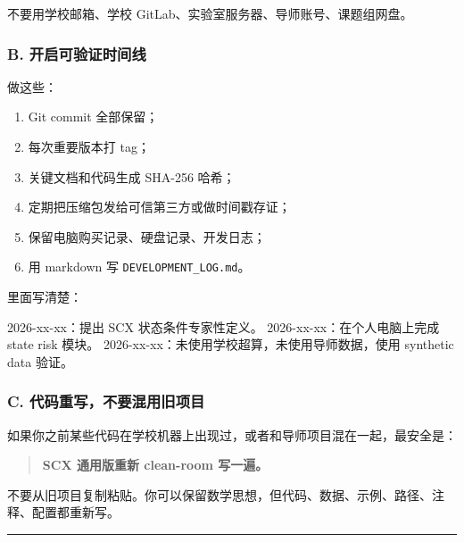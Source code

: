 \documentclass[
  12pt,
]{ctexart}
\newenvironment{Shaded}{}{}
\newcommand{\NormalTok}[1]{#1}
\providecommand{\tightlist}{%
  \setlength{\itemsep}{0pt}\setlength{\parskip}{0pt}}
\begin{document}
不要用学校邮箱、学校 GitLab、实验室服务器、导师账号、课题组网盘。

\subsubsection{B.
开启可验证时间线}\label{b.-ux5f00ux542fux53efux9a8cux8bc1ux65f6ux95f4ux7ebf}

做这些：

\begin{enumerate}
\def\labelenumi{\arabic{enumi}.}
\tightlist
\item
  Git commit 全部保留；
\item
  每次重要版本打 tag；
\item
  关键文档和代码生成 SHA-256 哈希；
\item
  定期把压缩包发给可信第三方或做时间戳存证；
\item
  保留电脑购买记录、硬盘记录、开发日志；
\item
  用 markdown 写 \texttt{DEVELOPMENT\_LOG.md}。
\end{enumerate}

里面写清楚：

\begin{Shaded}
\begin{Highlighting}[]
\NormalTok{2026{-}xx{-}xx：提出 SCX 状态条件专家性定义。}
\NormalTok{2026{-}xx{-}xx：在个人电脑上完成 state risk 模块。}
\NormalTok{2026{-}xx{-}xx：未使用学校超算，未使用导师数据，使用 synthetic data 验证。}
\end{Highlighting}
\end{Shaded}

\subsubsection{C.
代码重写，不要混用旧项目}\label{c.-ux4ee3ux7801ux91cdux5199ux4e0dux8981ux6df7ux7528ux65e7ux9879ux76ee}

如果你之前某些代码在学校机器上出现过，或者和导师项目混在一起，最安全是：

\begin{quote}
\textbf{SCX 通用版重新 clean-room 写一遍。}
\end{quote}

不要从旧项目复制粘贴。你可以保留数学思想，但代码、数据、示例、路径、注释、配置都重新写。

\begin{center}\rule{0.5\linewidth}{0.5pt}\end{center}
\end{document}
